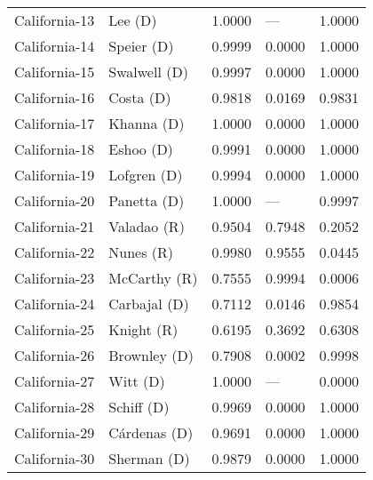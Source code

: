 \begin{longtable}{llrll}
     California-13 &              {\color{Blue} Lee (D)} &       1.0000 &           --- &        1.0000 \\
     California-14 &           {\color{Blue} Speier (D)} &       0.9999 &        0.0000 &        1.0000 \\
     California-15 &         {\color{Blue} Swalwell (D)} &       0.9997 &        0.0000 &        1.0000 \\
     California-16 &            {\color{Blue} Costa (D)} &       0.9818 &        0.0169 &        0.9831 \\
     California-17 &           {\color{Blue} Khanna (D)} &       1.0000 &        0.0000 &        1.0000 \\
     California-18 &            {\color{Blue} Eshoo (D)} &       0.9991 &        0.0000 &        1.0000 \\
     California-19 &          {\color{Blue} Lofgren (D)} &       0.9994 &        0.0000 &        1.0000 \\
     California-20 &          {\color{Blue} Panetta (D)} &       1.0000 &           --- &        0.9997 \\
     California-21 &           {\color{Red} Valadao (R)} &       0.9504 &        0.7948 &        0.2052 \\
     California-22 &             {\color{Red} Nunes (R)} &       0.9980 &        0.9555 &        0.0445 \\
     California-23 &          {\color{Red} McCarthy (R)} &       0.7555 &        0.9994 &        0.0006 \\
     California-24 &         {\color{Blue} Carbajal (D)} &       0.7112 &        0.0146 &        0.9854 \\
     California-25 &            {\color{Red} Knight (R)} &       0.6195 &        0.3692 &        0.6308 \\
     California-26 &         {\color{Blue} Brownley (D)} &       0.7908 &        0.0002 &        0.9998 \\
     California-27 &             {\color{Blue} Witt (D)} &       1.0000 &           --- &        0.0000 \\
     California-28 &           {\color{Blue} Schiff (D)} &       0.9969 &        0.0000 &        1.0000 \\
     California-29 &         {\color{Blue} Cárdenas (D)} &       0.9691 &        0.0000 &        1.0000 \\
     California-30 &          {\color{Blue} Sherman (D)} &       0.9879 &        0.0000 &        1.0000 \\

\end{longtable}
